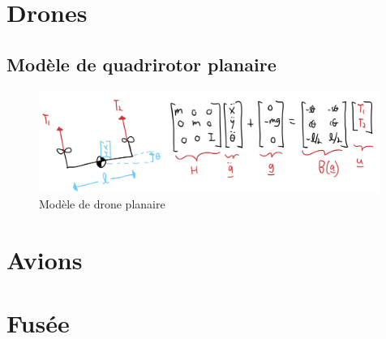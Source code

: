 \newpage
\section{Drones}

\subsection{Modèle de quadrirotor planaire}

\begin{figure}[htbp]
	\centering
		\includegraphics[width=0.99\textwidth]{fig/planar_drone.jpg}
	\caption{Modèle de drone planaire}
	\label{fig:planar_drone}
\end{figure}



\newpage
\section{Avions}



\newpage
\section{Fusée}